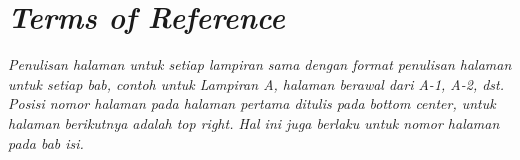 \chapter{\textit{Terms of Reference}}

\textit{Penulisan halaman untuk setiap lampiran sama dengan format penulisan halaman untuk setiap bab, contoh untuk Lampiran A, halaman berawal dari A-1, A-2, dst. Posisi nomor halaman pada halaman pertama ditulis pada bottom center, untuk halaman berikutnya adalah top right. Hal ini juga berlaku untuk nomor halaman pada bab isi.}